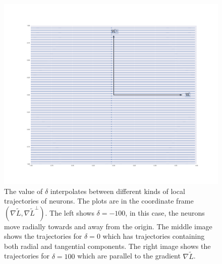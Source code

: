 \begin{figure}
    \includegraphics[width=\linewidth]{figures/dynamics_delta_100.pdf}
    \endminipage
    
    \caption{The value of $\delta$ interpolates between different kinds of local trajectories of neurons. The plots are in the coordinate frame $(\nabla \tilde{L}, \nabla \tilde{L}^\bot)$. The left shows $\delta = -100$, in this case, the neurons move radially towards and away from the origin. The middle image shows the trajectories for $\delta = 0$ which has trajectories containing both radial and tangential components. The right image shows the trajectories for $\delta = 100$ which are parallel to the gradient $\nabla \tilde{L}$.}
    \label{fig:my_label}
\end{figure}





